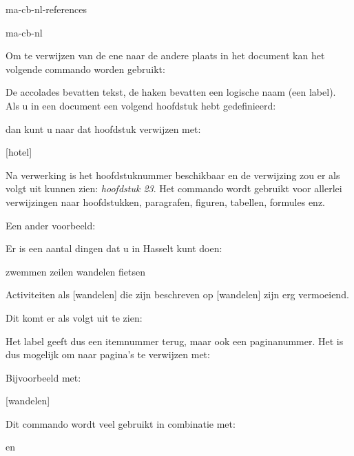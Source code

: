 \startonderdeel ma-cb-nl-references

\produkt ma-cb-nl




Om te verwijzen van de ene naar de andere plaats in het
document kan het volgende commando worden gebruikt:


De accolades bevatten tekst, de haken bevatten een logische
naam (een label). Als u in een document een volgend
hoofdstuk hebt gedefinieerd:

\starttypen
{}
\stoptypen

dan kunt u naar dat hoofdstuk verwijzen met:

\starttypen
{}[hotel]
\stoptypen

Na verwerking is het hoofdstuknummer beschikbaar en de
verwijzing zou er als volgt uit kunnen zien: {\em hoofdstuk
23}. Het commando \type{\in} wordt gebruikt voor allerlei
verwijzingen naar hoofdstukken, paragrafen, figuren,
tabellen, formules enz.

Een ander voorbeeld:

\startbuffer
Er is een aantal dingen dat u in Hasselt kunt doen:

\startopsomming[n,opelkaar]
\som zwemmen
\som zeilen
\som[wandelen] wandelen
\som fietsen
\stopopsomming

Activiteiten als [wandelen] die zijn
beschreven op [wandelen] zijn erg vermoeiend.
\stopbuffer

\typebuffer

Dit komt er als volgt uit te zien:

\haalbuffer

Het label  geeft dus een itemnummer terug,
maar ook een paginanummer. Het is dus mogelijk om naar
pagina's te verwijzen met:


Bijvoorbeeld met:

\starttypen
{}[wandelen]
\stoptypen

Dit commando wordt veel gebruikt in combinatie met:


en

